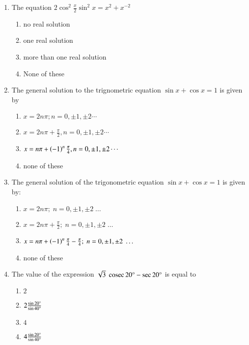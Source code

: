 \begin{enumerate}[label=\thesubsection.\arabic*,ref=\thesubsection.\theenumi]
  
  


	\item The equation $2\cos^{2}\frac{x}{2}\sin^{2}x = x^{2} +x^{-2}$  
		\hfill{}
      
		\begin{enumerate}
			\item no real solution
	  		\item one real solution
			\item more than one real solution 
			\item None of these
		\end{enumerate}
  


	\item The general solution to the trignometric equation $ \sin x + \cos x = 1$ is given by
		\hfill{}
  
		\begin{enumerate}
			\item $x=2n\pi;n=0,\pm1,\pm2 \cdots$
			\item  $x = 2n\pi + \frac{\pi}{2}, n = 0, \pm 1, \pm 2 \cdots $
			\item $x=n\pi+\left(-1\right)^{n}\frac{\pi}{4},n = 0,\pm 1,\pm 2 \cdots $ 
			\item none of these
		\end{enumerate}
  


    \item The general solution of the trigonometric equation $\sin {x} + \cos{x} = 1$ is given by:
        \hfill{}
        \begin{enumerate}
            \item $x = 2n\pi;\;n = 0,\pm1,\pm2\;\dots$
            \item $x = 2n\pi+\frac{\pi}{2};\;n = 0,\pm1,\pm2\;\dots$
            \item $x = n\pi+\left(-1\right)^n\frac{\pi}{4}-\frac{\pi}{4};\;n = 0,\pm1,\pm2\;\dots$
            \item none of these
        \end{enumerate}

    \item The value of the expression $\sqrt{3}\;\,\text{cosec}\,{20\degree}-\sec{20\degree}$ is equal to
        \hfill{}
        \begin{enumerate}
                \item $2$
                \item $2\frac{\sin{20\degree}}{\sin{40\degree}}$
                \item $4$
                \item $4\frac{\sin{20\degree}}{\sin{40\degree}}$
        \end{enumerate}


\end{enumerate}
